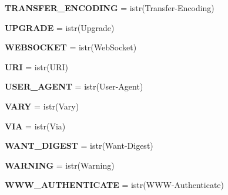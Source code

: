 \begin{DoxyCompactItemize}
{\bfseries T\+R\+A\+N\+S\+F\+E\+R\+\_\+\+E\+N\+C\+O\+D\+I\+NG} = istr(\textquotesingle{}Transfer-\/Encoding\textquotesingle{})
\item 
\mbox{\label{namespaceaiohttp_1_1hdrs_a1563cca1bdd6ca0aa0c5516dd2a16380}} 
{\bfseries U\+P\+G\+R\+A\+DE} = istr(\textquotesingle{}Upgrade\textquotesingle{})
\item 
\mbox{\label{namespaceaiohttp_1_1hdrs_aee7db6e8ace8b9682f6693dbdf71b260}} 
{\bfseries W\+E\+B\+S\+O\+C\+K\+ET} = istr(\textquotesingle{}Web\+Socket\textquotesingle{})
\item 
\mbox{\label{namespaceaiohttp_1_1hdrs_a95d7d96569497086fb34e017128fe62e}} 
{\bfseries U\+RI} = istr(\textquotesingle{}U\+RI\textquotesingle{})
\item 
\mbox{\label{namespaceaiohttp_1_1hdrs_a971f4b9608ebd9fdd927b579ceed65e9}} 
{\bfseries U\+S\+E\+R\+\_\+\+A\+G\+E\+NT} = istr(\textquotesingle{}User-\/Agent\textquotesingle{})
\item 
\mbox{\label{namespaceaiohttp_1_1hdrs_a5d07b93a52675cf660033f86671e3789}} 
{\bfseries V\+A\+RY} = istr(\textquotesingle{}Vary\textquotesingle{})
\item 
\mbox{\label{namespaceaiohttp_1_1hdrs_a321197113b8b966de7c36497211b88db}} 
{\bfseries V\+IA} = istr(\textquotesingle{}Via\textquotesingle{})
\item 
\mbox{\label{namespaceaiohttp_1_1hdrs_ac092913aa6d4dc2d30b5a0a99dbbae5f}} 
{\bfseries W\+A\+N\+T\+\_\+\+D\+I\+G\+E\+ST} = istr(\textquotesingle{}Want-\/Digest\textquotesingle{})
\item 
\mbox{\label{namespaceaiohttp_1_1hdrs_a8c0dc691bc3226c23892f8307e70bef5}} 
{\bfseries W\+A\+R\+N\+I\+NG} = istr(\textquotesingle{}Warning\textquotesingle{})
\item 
\mbox{\label{namespaceaiohttp_1_1hdrs_acb07fddede3e7c1c41d09b5ef3b7348c}} 
{\bfseries W\+W\+W\+\_\+\+A\+U\+T\+H\+E\+N\+T\+I\+C\+A\+TE} = istr(\textquotesingle{}W\+WW-\/Authenticate\textquotesingle{})

\end{DoxyCompactItemize}
